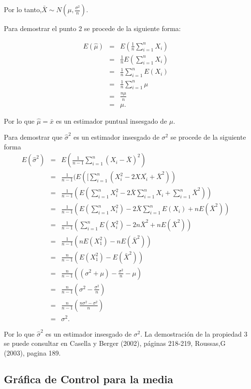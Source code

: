 \documentclass[spanish]{report}
\begin{document}
Por lo tanto,$\bar{X}\sim N(\mu,\frac{\sigma^{2}}{n})$.

Para demostrar el punto 2 se procede de la siguiente forma: 

\begin{eqnarray*}
E(\hat{\mu}) & = & E(\frac{1}{n}\sum_{i=1}^{n}X_{i})\\
 & = & \frac{1}{n}E(\sum_{i=1}^{n}X_{i})\\
 & = & \frac{1}{n}\sum_{i=1}^{n}E(X_{i})\\
 & = & \frac{1}{n}\sum_{i=1}^{n}\mu\\
 & = & \frac{n\mu}{n}\\
 & = & \mu.
\end{eqnarray*}

Por lo que $\hat{\mu}=\bar{x}$ es un estimador puntual insesgado
de $\mu$.

Para demostrar que $\hat{\sigma}^{2}$ es un estimador insesgado
de $\sigma^{2}$ se procede de la siguiente forma
\begin{eqnarray*}
E(\hat{\sigma}^{2}) & = & E(\frac{1}{n-1}\sum_{i=1}^{n}(X_{i}-\bar{X})^{2})\\
 & = & \frac{1}{n-1}(E([\sum_{i=1}^{n}(X_{i}^{2}-2\bar{XX_{i}+}\bar{X}^{2}))\\
 & = & \frac{1}{n-1}(E(\sum_{i=1}^{n}X_{i}^{2}-2\bar{X}\sum_{i=1}^{n}X_{i}+\sum_{i=1}^{n}\bar{X}^{2}))\\
 & = & \frac{1}{n-1}(E(\sum_{i=1}^{n}X_{i}^{2})-2\bar{X}\sum_{i=1}^{n}E(X_{i})+nE(\bar{X}^{2}))\\
 & = & \frac{1}{n-1}(\sum_{i=1}^{n}E(X_{i}^{2})-2n\bar{X}^{2}+nE(\bar{X}^{2}))\\
 & = & \frac{1}{n-1}(nE(X_{1}^{2})-nE(\bar{X}^{2}))\\
 & = & \frac{n}{n-1}(E(X_{1}^{2})-E(\bar{X}^{2}))\\
 & = & \frac{n}{n-1}((\sigma^{2}+\mu)-\frac{\sigma^{2}}{n}-\mu)\\
 & = & \frac{n}{n-1}(\sigma^{2}-\frac{\sigma^{2}}{n})\\
 & = & \frac{n}{n-1}(\frac{n\sigma^{2}-\sigma^{2}}{n})\\
 & = & \sigma^{2}.
\end{eqnarray*}


Por lo que $\hat{\sigma}^{2}$ es un estimador insesgado de $\sigma^{2}$. La
demostración de la propiedad 3 se puede consultar en Casella y Berger
(2002), páginas 218-219, Roussas,G (2003), pagina 189.


\subsection{Gráfica de Control para la media}
\end{document}
